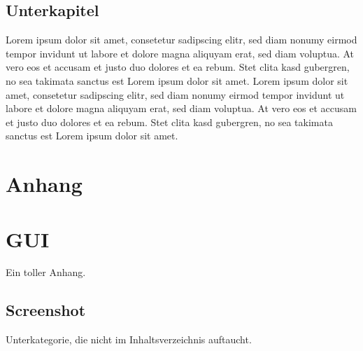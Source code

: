 \documentclass[12pt,a4paper,bibliography=totocnumbered,listof=totocnumbered]{scrartcl}
\begin{document}
    \subsection{Unterkapitel}
    Lorem ipsum dolor sit amet, consetetur sadipscing elitr, sed diam nonumy eirmod tempor invidunt ut labore et dolore magna aliquyam erat, sed diam voluptua. At vero eos et accusam et justo duo dolores et ea rebum. Stet clita kasd gubergren, no sea takimata sanctus est Lorem ipsum dolor sit amet. Lorem ipsum dolor sit amet, consetetur sadipscing elitr, sed diam nonumy eirmod tempor invidunt ut labore et dolore magna aliquyam erat, sed diam voluptua. At vero eos et accusam et justo duo dolores et ea rebum. Stet clita kasd gubergren, no sea takimata sanctus est Lorem ipsum dolor sit amet.
    \pagebreak

    \renewcommand\refname{Quellenverzeichnis}
    
    
    \pagebreak

    \setcounter{page}{1}

    \begin{appendix}
        \section*{Anhang}

        \section{GUI}
        Ein toller Anhang.

        \subsection*{Screenshot}
        \label{app:screenshot}
        Unterkategorie, die nicht im Inhaltsverzeichnis auftaucht.

    \end{appendix}
\end{document}

